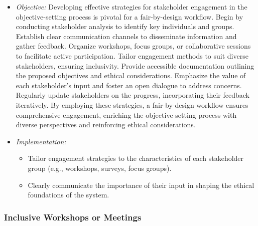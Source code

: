 \documentclass[12pt,a4paper,openright,twoside]{book}
\begin{document}
\begin{itemize}

    \item \emph{Objective:} Developing effective strategies for stakeholder engagement in the objective-setting process is pivotal for a fair-by-design workflow. Begin by conducting stakeholder analysis to identify key individuals and groups. Establish clear communication channels to disseminate information and gather feedback. Organize workshops, focus groups, or collaborative sessions to facilitate active participation. Tailor engagement methods to suit diverse stakeholders, ensuring inclusivity. Provide accessible documentation outlining the proposed objectives and ethical considerations. Emphasize the value of each stakeholder's input and foster an open dialogue to address concerns. Regularly update stakeholders on the progress, incorporating their feedback iteratively. By employing these strategies, a fair-by-design workflow ensures comprehensive engagement, enriching the objective-setting process with diverse perspectives and reinforcing ethical considerations.

    \item \emph{Implementation:}

    \begin{itemize}

        \item Tailor engagement strategies to the characteristics of each stakeholder group (e.g., workshops, surveys, focus groups).

        \item Clearly communicate the importance of their input in shaping the ethical foundations of the system.

    \end{itemize}

\end{itemize}

\subsubsection{Inclusive Workshops or Meetings}
\end{document}
